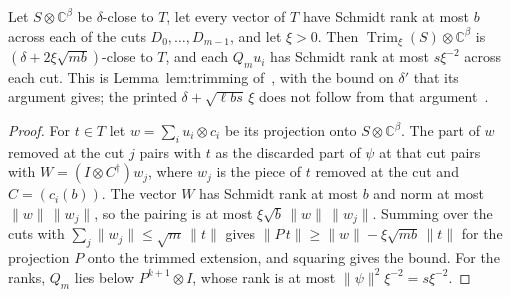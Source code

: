 \begin{theorem}[Trimming]
    \label{thm:viable_trimming}
    \leanok
    Let $S\otimes\mathbb C^\beta$ be $\delta$-close to $T$, let every vector of
    $T$ have Schmidt rank at most $b$ across each of the cuts
    $D_0,\dots,D_{m-1}$, and let $\xi>0$. Then
    $\operatorname{Trim}_\xi(S)\otimes\mathbb C^\beta$ is
    $(\delta+2\xi\sqrt{mb})$-close to $T$, and each $Q_mu_i$ has Schmidt rank
    at most $s\xi^{-2}$ across each cut. This is
    Lemma~lem:trimming of~\cite[lines 660--697]{Arad2016RigorousRG}, with the
    bound on $\delta'$ that its argument gives; the printed
    $\delta+\sqrt{\ell bs}\,\xi$ does not follow from that
    argument~\cite{gap:alvv16_trimming_constant}.
\end{theorem}

\begin{proof}
    \leanok
    For $t\in T$ let $w=\sum_iu_i\otimes c_i$ be its projection onto
    $S\otimes\mathbb C^\beta$. The part of $w$ removed at the cut $j$ pairs with
    $t$ as the discarded part of $\psi$ at that cut pairs with
    $W=(I\otimes C^\dagger)w_j$, where $w_j$ is the piece of $t$ removed at the
    cut and $C=(c_i(b))$. The vector $W$ has Schmidt rank at most $b$ and norm
    at most $\|w\|\,\|w_j\|$, so the pairing is at most
    $\xi\sqrt b\,\|w\|\,\|w_j\|$. Summing over the cuts with
    $\sum_j\|w_j\|\le\sqrt m\,\|t\|$ gives
    $\|P\,t\|\ge\|w\|-\xi\sqrt{mb}\,\|t\|$ for the projection $P$ onto the
    trimmed extension, and squaring gives the bound. For the ranks, $Q_m$ lies
    below $P^{k+1}\otimes I$, whose rank is at most $\|\psi\|^2\xi^{-2}=s\xi^{-2}$.
\end{proof}

